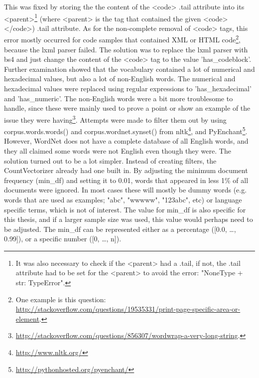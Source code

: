 This was fixed by storing the the content of the <code> .tail attribute into its <parent>\footnote{
	It was also necessary to check if the <parent> had a .tail, if not, the .tail attribute had to be set for the <parent> to avoid the error: 
	"NoneType + str: TypeError".
	} 
(where <parent> is the tag that contained the given <code></code>) .tail attribute. 
As for the non-complete removal of <code> tags, this error mostly occurred for code samples that contained XML or HTML code\footnote{
	One example is this question: \\
	\url{http://stackoverflow.com/questions/19535331/print-page-specific-area-or-element}.
	}, 
because the lxml parser failed. 
The solution was to replace the lxml parser with bs4 and just change the content of the <code> tag to the value 'has\_codeblock'.
\vspace{0.5em}\newline
Further examination showed that the vocabulary contained a lot of numerical and hexadecimal values, but also a lot of non-English words. 
The numerical and hexadecimal values were replaced using regular expressions to 'has\_hexadecimal' and 'has\_numeric'. 
The non-English words were a bit more troublesome to handle, since these were mainly used to prove a point or show an example of the issue they were having\footnote{ 
	\url{http://stackoverflow.com/questions/856307/wordwrap-a-very-long-string}.
	}. 
Attempts were made to filter them out by using corpus.words.words() and corpus.wordnet.synset() 
from \gls{nltk}\footnote{\url{http://www.nltk.org/}}, and PyEnchant\footnote{\url{http://pythonhosted.org/pyenchant/}}. 
However, WordNet does not have a complete database of all English words, and they all claimed some words were not English even though they were.
\vspace{0.5em}\newline
The solution turned out to be a lot simpler. 
Instead of creating filters, the CountVectorizer already had one built in. 
By adjusting the minimum document frequency (min\_df) and setting it to 0.01, words that appeared in less 1\% of all documents were ignored.
In most cases these will mostly be dummy words (e.g. words that are used as examples; "abc", "wwwww", "123abc", etc) or language specific terms, which is not of interest.
The value for min\_df is also specific for this thesis, and if a larger sample size was used, this value would perhaps need to be adjusted. 
The min\_df can be represented either as a percentage ([0.0, \ldots, 0.99]), or a specific number ([0, \ldots, n]).


